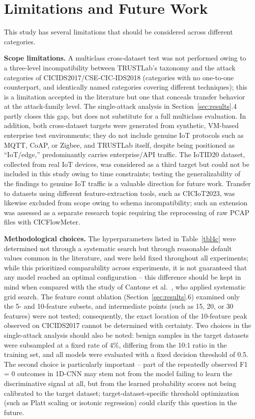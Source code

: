 \documentclass[a4paper,fleqn]{cas-sc}
\begin{document}
\FloatBarrier
\section{Limitations and Future Work}
\label{sec:limitations}

This study has several limitations that should be considered across different categories.

\textbf{Scope limitations.} A multiclass cross-dataset test was not performed owing to a three-level incompatibility between TRUSTLab's taxonomy and the attack categories of CICIDS2017/CSE-CIC-IDS2018 (categories with no one-to-one counterpart, and identically named categories covering different techniques); this is a limitation accepted in the literature but one that conceals transfer behavior at the attack-family level. The single-attack analysis in Section~\ref{sec:results}.4 partly closes this gap, but does not substitute for a full multiclass evaluation. In addition, both cross-dataset targets were generated from synthetic, VM-based enterprise test environments; they do not include genuine IoT protocols such as MQTT, CoAP, or Zigbee, and TRUSTLab itself, despite being positioned as ``IoT/edge,'' predominantly carries enterprise/API traffic. The IoTID20 dataset, collected from real IoT devices, was considered as a third target but could not be included in this study owing to time constraints; testing the generalizability of the findings to genuine IoT traffic is a valuable direction for future work. Transfer to datasets using different feature-extraction tools, such as CICIoT2023, was likewise excluded from scope owing to schema incompatibility; such an extension was assessed as a separate research topic requiring the reprocessing of raw PCAP files with CICFlowMeter.

\textbf{Methodological choices.} The hyperparameters listed in Table~\ref{tbl4c} were determined not through a systematic search but through reasonable default values common in the literature, and were held fixed throughout all experiments; while this prioritized comparability across experiments, it is not guaranteed that any model reached an optimal configuration -- this difference should be kept in mind when compared with the study of Cantone et al.~\cite{Cantone2024}, who applied systematic grid search. The feature count ablation (Section~\ref{sec:results}.6) examined only the 5- and 10-feature subsets, and intermediate points (such as 15, 20, or 30 features) were not tested; consequently, the exact location of the 10-feature peak observed on CICIDS2017 cannot be determined with certainty. Two choices in the single-attack analysis should also be noted: benign samples in the target datasets were subsampled at a fixed rate of 4\%, differing from the 10:1 ratio in the training set, and all models were evaluated with a fixed decision threshold of 0.5. The second choice is particularly important -- part of the repeatedly observed F1 = 0 outcomes in 1D-CNN may stem not from the model failing to learn the discriminative signal at all, but from the learned probability scores not being calibrated to the target dataset; target-dataset-specific threshold optimization (such as Platt scaling or isotonic regression) could clarify this question in the future.
\end{document}
